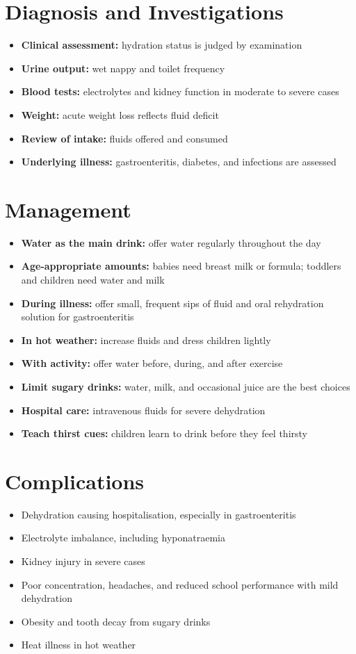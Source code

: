 \section*{Diagnosis and Investigations}
\begin{itemize}
    \item \textbf{Clinical assessment:} hydration status is judged by examination
    \item \textbf{Urine output:} wet nappy and toilet frequency
    \item \textbf{Blood tests:} electrolytes and kidney function in moderate to severe cases
    \item \textbf{Weight:} acute weight loss reflects fluid deficit
    \item \textbf{Review of intake:} fluids offered and consumed
    \item \textbf{Underlying illness:} gastroenteritis, diabetes, and infections are assessed
\end{itemize}

\section*{Management}
\begin{itemize}
    \item \textbf{Water as the main drink:} offer water regularly throughout the day
    \item \textbf{Age-appropriate amounts:} babies need breast milk or formula; toddlers and children need water and milk
    \item \textbf{During illness:} offer small, frequent sips of fluid and oral rehydration solution for gastroenteritis
    \item \textbf{In hot weather:} increase fluids and dress children lightly
    \item \textbf{With activity:} offer water before, during, and after exercise
    \item \textbf{Limit sugary drinks:} water, milk, and occasional juice are the best choices
    \item \textbf{Hospital care:} intravenous fluids for severe dehydration
    \item \textbf{Teach thirst cues:} children learn to drink before they feel thirsty
\end{itemize}

\section*{Complications}
\begin{itemize}
    \item Dehydration causing hospitalisation, especially in gastroenteritis
    \item Electrolyte imbalance, including hyponatraemia
    \item Kidney injury in severe cases
    \item Poor concentration, headaches, and reduced school performance with mild dehydration
    \item Obesity and tooth decay from sugary drinks
    \item Heat illness in hot weather
\end{itemize}

